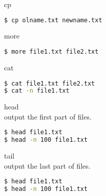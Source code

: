 \documentclass{beamer}
\begin{document}
\begin{frame}[fragile]
 \begin{center}
    \huge{cp}\\
    \end{center}
\begin{lstlisting}[language=bash]
$ cp olname.txt newname.txt
\end{lstlisting}
\end{frame}



\begin{frame}[fragile]
 \begin{center}
    \huge{more}\\
    \end{center}
\begin{lstlisting}[language=bash]
$ more file1.txt file2.txt
\end{lstlisting}
\end{frame}





\begin{frame}[fragile]
 \begin{center}
    \huge{cat}\\
    \end{center}
\begin{lstlisting}[language=bash]
$ cat file1.txt file2.txt
$ cat -n file1.txt
\end{lstlisting}
\end{frame}


\begin{frame}[fragile]
 \begin{center}
    \huge{head}\\
     output the first part of files.\\
    \end{center}
\begin{lstlisting}[language=bash]
$ head file1.txt
$ head -n 100 file1.txt
\end{lstlisting}
\end{frame}


\begin{frame}[fragile]
 \begin{center}
    \huge{tail}\\
     output the last part of files.\\
    \end{center}
\begin{lstlisting}[language=bash]
$ head file1.txt
$ head -n 100 file1.txt
\end{lstlisting}
\end{frame}
\end{document}
